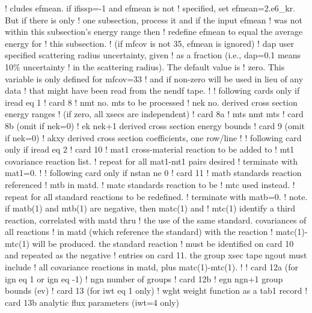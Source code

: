 \begin{ccode}
   !            cludes efmean.  if ifissp=-1 and efmean is not
   !            specified, set efmean=2.e6_kr.  But if there is only
   !            one subsection, process it and if the input efmean
   !            was not within this subsection's energy range then
   !            redefine efmean to equal the average energy for
   !            this subsection.
   !            (if mfcov is not 35, efmean is ignored)
   !    dap     user specified scattering radius uncertainty, given
   !            as a fraction (i.e., dap=0.1 means 10\% uncertainty
   !            in the scattering radius).  The default value is
   !            zero.  This variable is only defined for mfcov=33
   !            and if non-zero will be used in lieu of any data
   !            that might have been read from the nendf tape.
   !
   !  following cards only if iread eq 1
   !  card 8
   !    nmt     no. mts to be processed
   !    nek     no. derived cross section energy ranges
   !            (if zero, all xsecs are independent)
   !  card 8a
   !    mts     nmt mts
   !  card 8b   (omit if nek=0)
   !    ek      nek+1 derived cross section energy bounds
   !  card 9    (omit if nek=0)
   !    akxy    derived cross section coefficients, one row/line
   !
   !  following card only if iread eq 2
   !  card 10
   !    mat1    cross-material reaction to be added to
   !    mt1         covariance reaction list.
   !            repeat for all mat1-mt1 pairs desired
   !            terminate with mat1=0.
   !
   !  following card only if nstan ne 0
   !  card 11
   !    matb    standards reaction referenced
   !    mtb         in matd.
   !    matc    standards reaction to be
   !    mtc         used instead.
   !            repeat for all standard reactions to be redefined.
   !            terminate with matb=0.
   !  note.  if matb(1) and mtb(1) are negative, then matc(1) and
   !    mtc(1) identify a third reaction, correlated with matd thru
   !    the use of the same standard.  covariances of all reactions
   !    in matd (which reference the standard) with the reaction
   !    matc(1)-mtc(1) will be produced.  the standard reaction
   !    must be identified on card 10 and repeated as the negative
   !    entries on card 11.  the group xsec tape ngout must include
   !    all covariance reactions in matd, plus matc(1)-mtc(1).
   !
   !  card 12a (for ign eq 1 or ign eq -1)
   !    ngn     number of groups
   !  card 12b
   !    egn     ngn+1 group bounds (ev)
   !  card 13 (for iwt eq 1 only)
   !    wght    weight function as a tab1 record
   !  card 13b  analytic flux parameters (iwt=4 only)

\end{ccode}
